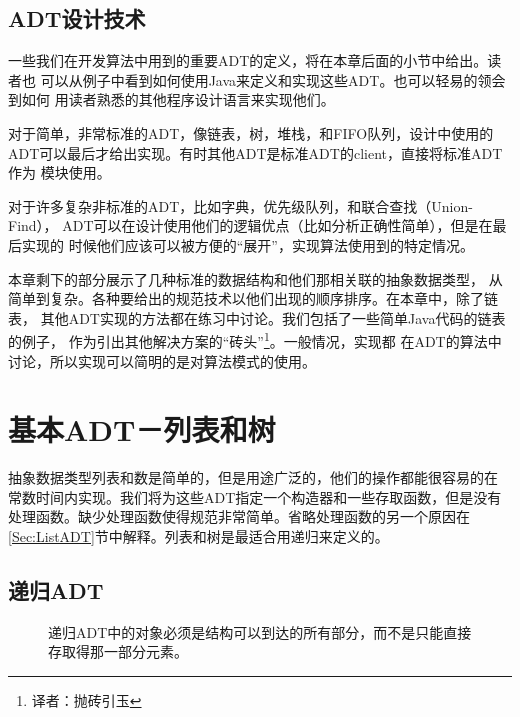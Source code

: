 \subsection{ADT设计技术}
一些我们在开发算法中用到的重要ADT的定义，将在本章后面的小节中给出。读者也
可以从例子中看到如何使用Java来定义和实现这些ADT。也可以轻易的领会到如何
用读者熟悉的其他程序设计语言来实现他们。

对于简单，非常标准的ADT，像链表，树，堆栈，和FIFO队列，设计中使用的
ADT可以最后才给出实现。有时其他ADT是标准ADT的client，直接将标准ADT作为
模块使用。

对于许多复杂非标准的ADT，比如字典，优先级队列，和联合查找（Union-Find），
ADT可以在设计使用他们的逻辑优点（比如分析正确性简单），但是在最后实现的
时候他们应该可以被方便的“展开”，实现算法使用到的特定情况。

本章剩下的部分展示了几种标准的数据结构和他们那相关联的抽象数据类型，
从简单到复杂。各种要给出的规范技术以他们出现的顺序排序。在本章中，除了链表，
其他ADT实现的方法都在练习中讨论。我们包括了一些简单Java代码的链表的例子，
作为引出其他解决方案的“砖头”\footnote{译者：抛砖引玉}。一般情况，实现都
在ADT的算法中讨论，所以实现可以简明的是对算法模式的使用。


\section{基本ADT－列表和树}
抽象数据类型列表和数是简单的，但是用途广泛的，他们的操作都能很容易的在
常数时间内实现。我们将为这些ADT指定一个构造器和一些存取函数，但是没有
处理函数。缺少处理函数使得规范非常简单。省略处理函数的另一个原因在
\ref{Sec:ListADT}节中解释。列表和树是最适合用递归来定义的。

\subsection{递归ADT}
\begin{figure*}[!t]
    \centering
    \caption{递归ADT中的对象必须是结构可以到达的所有部分，而不是只能直接存取得那一部分元素。}
    \label{Fig:ExampleOfRecursiveADT}
\end{figure*}


